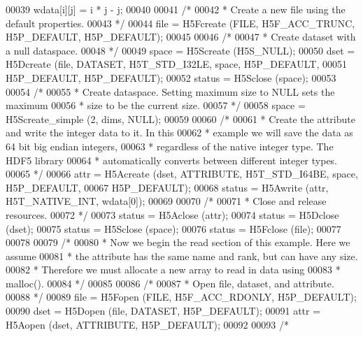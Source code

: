 \begin{DoxyCode}
00039             wdata[i][j] = i * j - j;
00040 
00041     \textcolor{comment}{/*}
00042 \textcolor{comment}{     * Create a new file using the default properties.}
00043 \textcolor{comment}{     */}
00044     file = H5Fcreate (FILE, H5F\_ACC\_TRUNC, H5P\_DEFAULT, H5P\_DEFAULT);
00045 
00046     \textcolor{comment}{/*}
00047 \textcolor{comment}{     * Create dataset with a null dataspace.}
00048 \textcolor{comment}{     */}
00049     space = H5Screate (H5S\_NULL);
00050     dset = H5Dcreate (file, DATASET, H5T\_STD\_I32LE, space, H5P\_DEFAULT,
00051                 H5P\_DEFAULT, H5P\_DEFAULT);
00052     status = H5Sclose (space);
00053 
00054     \textcolor{comment}{/*}
00055 \textcolor{comment}{     * Create dataspace.  Setting maximum size to NULL sets the maximum}
00056 \textcolor{comment}{     * size to be the current size.}
00057 \textcolor{comment}{     */}
00058     space = H5Screate\_simple (2, dims, NULL);
00059 
00060     \textcolor{comment}{/*}
00061 \textcolor{comment}{     * Create the attribute and write the integer data to it.  In this}
00062 \textcolor{comment}{     * example we will save the data as 64 bit big endian integers,}
00063 \textcolor{comment}{     * regardless of the native integer type.  The HDF5 library}
00064 \textcolor{comment}{     * automatically converts between different integer types.}
00065 \textcolor{comment}{     */}
00066     attr = H5Acreate (dset, ATTRIBUTE, H5T\_STD\_I64BE, space, H5P\_DEFAULT,
00067                 H5P\_DEFAULT);
00068     status = H5Awrite (attr, H5T\_NATIVE\_INT, wdata[0]);
00069 
00070     \textcolor{comment}{/*}
00071 \textcolor{comment}{     * Close and release resources.}
00072 \textcolor{comment}{     */}
00073     status = H5Aclose (attr);
00074     status = H5Dclose (dset);
00075     status = H5Sclose (space);
00076     status = H5Fclose (file);
00077 
00078 
00079     \textcolor{comment}{/*}
00080 \textcolor{comment}{     * Now we begin the read section of this example.  Here we assume}
00081 \textcolor{comment}{     * the attribute has the same name and rank, but can have any size.}
00082 \textcolor{comment}{     * Therefore we must allocate a new array to read in data using}
00083 \textcolor{comment}{     * malloc().}
00084 \textcolor{comment}{     */}
00085 
00086     \textcolor{comment}{/*}
00087 \textcolor{comment}{     * Open file, dataset, and attribute.}
00088 \textcolor{comment}{     */}
00089     file = H5Fopen (FILE, H5F\_ACC\_RDONLY, H5P\_DEFAULT);
00090     dset = H5Dopen (file, DATASET, H5P\_DEFAULT);
00091     attr = H5Aopen (dset, ATTRIBUTE, H5P\_DEFAULT);
00092 
00093     \textcolor{comment}{/*}

\end{DoxyCode}

